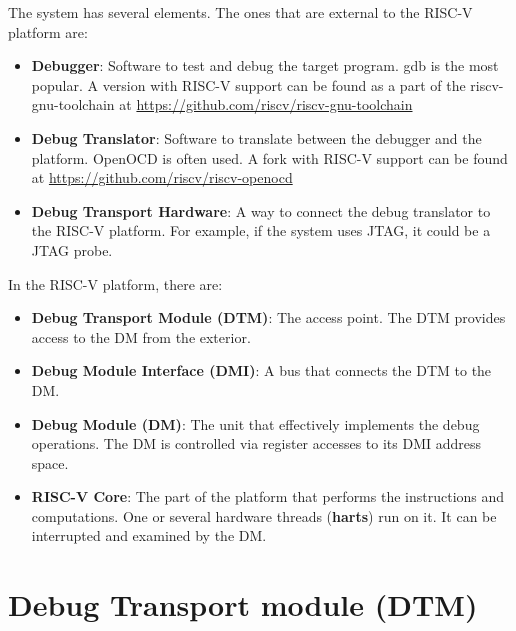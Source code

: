 \documentclass{article}
\begin{document}
	The system has several elements. The ones that are external to the RISC-V platform are:
	
	\begin{itemize}
	
	\item \textbf{Debugger}: Software to test and debug the target program. gdb is the most popular. A version with RISC-V support can be found as a part of the riscv-gnu-toolchain at \url{https://github.com/riscv/riscv-gnu-toolchain}
	
	\item \textbf{Debug Translator}: Software to translate between the debugger and the platform. OpenOCD is often used. A fork with RISC-V support can be found at \url{https://github.com/riscv/riscv-openocd}
	
	\item \textbf{Debug Transport Hardware}: A way to connect the debug translator to the RISC-V platform. For example, if the system uses JTAG, it could be a JTAG probe.
	
	\end{itemize}
	
	In the RISC-V platform, there are:
	
	\begin{itemize}
	
	\item \textbf{Debug Transport Module (DTM)}: The access point. The DTM provides access to the DM from the exterior.
	
	\item \textbf{Debug Module Interface (DMI)}: A bus that connects the DTM to the DM.
	
	\item \textbf{Debug Module (DM)}: The unit that effectively implements the debug operations. The DM is controlled via register accesses to its DMI address space.
	
	\item \textbf{RISC-V Core}: The part of the platform that performs the instructions and computations. One or several hardware threads (\textbf{harts}) run on it. It can be interrupted and examined by the DM.
	
	\end{itemize}
	
	\newpage
	\section{Debug Transport module (DTM)}
	
\end{document}
